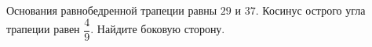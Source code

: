\begin{ex}
	\begin{condition}
		Основания равнобедренной трапеции равны \( 29  \) и \( 37 \). Косинус острого угла трапеции равен \( \dfrac{4}{9} \).  Найдите боковую сторону.
	\end{condition}
\end{ex}